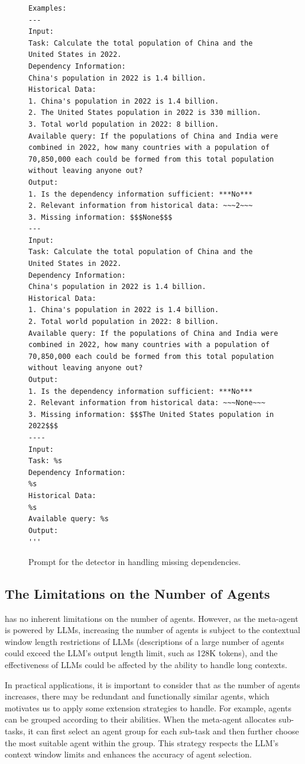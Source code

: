 \begin{figure}
\begin{lstlisting}[frame=single, basicstyle=\scriptsize\ttfamily, breaklines=true]
Examples:
---
Input:
Task: Calculate the total population of China and the United States in 2022.
Dependency Information: 
China's population in 2022 is 1.4 billion. 
Historical Data:
1. China's population in 2022 is 1.4 billion. 
2. The United States population in 2022 is 330 million.
3. Total world population in 2022: 8 billion.
Available query: If the populations of China and India were combined in 2022, how many countries with a population of 70,850,000 each could be formed from this total population without leaving anyone out?
Output:
1. Is the dependency information sufficient: ***No***
2. Relevant information from historical data: ~~~2~~~
3. Missing information: $$$None$$$
---
Input:
Task: Calculate the total population of China and the United States in 2022.
Dependency Information: 
China's population in 2022 is 1.4 billion. 
Historical Data:
1. China's population in 2022 is 1.4 billion. 
2. Total world population in 2022: 8 billion.
Available query: If the populations of China and India were combined in 2022, how many countries with a population of 70,850,000 each could be formed from this total population without leaving anyone out?
Output:
1. Is the dependency information sufficient: ***No***
2. Relevant information from historical data: ~~~None~~~
3. Missing information: $$$The United States population in 2022$$$
----
Input:
Task: %s
Dependency Information: 
%s
Historical Data:
%s
Available query: %s
Output:
'''
\end{lstlisting}
\caption{Prompt for the detector in handling missing dependencies.}
\label{det_dep}
\end{figure}









\subsection{The Limitations on the Number of Agents}
\label{app:number_of_agents}
\name has no inherent limitations on the number of agents. However, as the meta-agent is powered by LLMs, increasing the number of agents is subject to the contextual window length restrictions of LLMs (descriptions of a large number of agents could exceed the LLM's output length limit, such as 128K tokens), and the effectiveness of LLMs could be affected by the ability to handle long contexts.

In practical applications, it is important to consider that as the number of agents increases, there may be redundant and functionally similar agents, which motivates us to apply some extension strategies to handle. For example, agents can be grouped according to their abilities. When the meta-agent allocates sub-tasks, it can first select an agent group for each sub-task and then further choose the most suitable agent within the group. This strategy respects the LLM's context window limits and enhances the accuracy of agent selection.






